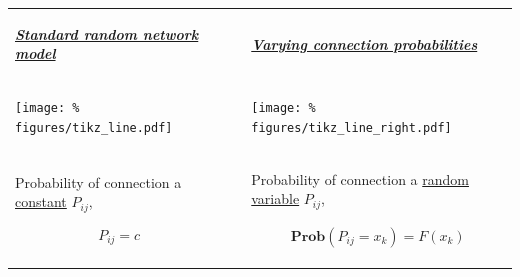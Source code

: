 \begin{frame}{}

  \setlength{\parindent}{0pt}

  \vspace{-0.2cm}
      \begin{tabular}{  p{}   p{}  p{} }

    \begin{center}
      \underline{\textit{\textbf{Standard random network model}}}    \end{center}

    &&

    \begin{center}
      \underline{\textit{\textbf{Varying connection probabilities}}}
    \end{center}

    \\

    \begin{center}\vspace{-0.71cm}
      \texttt{[image: \%
        figures/tikz\_line.pdf]} %
    \end{center}%

    &&

    \begin{center}\vspace{-0.71cm}
      \texttt{[image: \%
        figures/tikz\_line\_right.pdf]} %
    \end{center}%

    \\

    Probability of connection a \ul{constant} $P_{ij}$,
    
    \begin{align*}
      P_{ij} = c
    \end{align*}

    &&

    Probability of connection a \ul{random variable} $P_{ij}$,
    \vspace{0.01cm}
    
    \begin{align*}
      \mathbf{Prob}(P_{ij}=x_k) = F(x_k)
    \end{align*}	


\end{tabular}
\end{frame}
